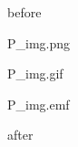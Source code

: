 \documentclass[11pt,a4paper]{article}
\begin{document}
before

P\_img.png

\begin{figure}[h]
\end{figure}

P\_img.gif

\begin{figure}[h]
\end{figure}

P\_img.emf

\begin{figure}[h]
\end{figure}

after
\end{document}
